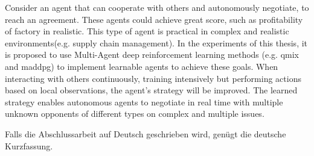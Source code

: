 
Consider an agent that can cooperate with others and autonomously negotiate, to reach an agreement. These agents could achieve great score, such as profitability of factory in realistic. This type of agent is practical in complex and realistic environments(e.g. supply chain management). In the experiments of this thesis, it is proposed to use Multi-Agent deep reinforcement learning methods (e.g. \gls{qmix} and \gls{maddpg}) to implement learnable agents to achieve these goals. When interacting with others continuously, training intensively but performing actions based on local observations, the agent’s strategy will be improved. The learned strategy enables autonomous agents to negotiate in real time with multiple unknown opponents of different types on complex and multiple issues.


Falls die Abschlussarbeit auf Deutsch geschrieben wird, genügt die deutsche Kurzfassung.
